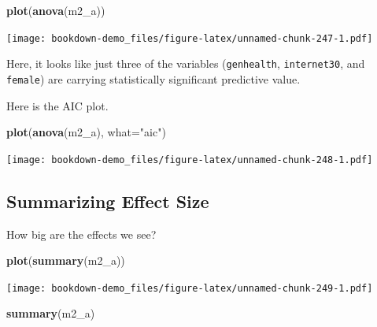\documentclass[]{book}
\newenvironment{Shaded}{\begin{snugshade}}{\end{snugshade}}
\newcommand{\KeywordTok}[1]{\textcolor[rgb]{0.13,0.29,0.53}{\textbf{#1}}}
\newcommand{\DataTypeTok}[1]{\textcolor[rgb]{0.13,0.29,0.53}{#1}}
\newcommand{\StringTok}[1]{\textcolor[rgb]{0.31,0.60,0.02}{#1}}
\newcommand{\NormalTok}[1]{#1}
\theoremstyle{definition}
\theoremstyle{definition}
\theoremstyle{definition}
\theoremstyle{remark}
\begin{document}
\begin{Shaded}
\begin{Highlighting}[]
\KeywordTok{plot}\NormalTok{(}\KeywordTok{anova}\NormalTok{(m2_a))}
\end{Highlighting}
\end{Shaded}

\texttt{[image: bookdown-demo\_files/figure-latex/unnamed-chunk-247-1.pdf]}

Here, it looks like just three of the variables (\texttt{genhealth},
\texttt{internet30}, and \texttt{female}) are carrying statistically
significant predictive value.

Here is the AIC plot.

\begin{Shaded}
\begin{Highlighting}[]
\KeywordTok{plot}\NormalTok{(}\KeywordTok{anova}\NormalTok{(m2_a), }\DataTypeTok{what=}\StringTok{"aic"}\NormalTok{)}
\end{Highlighting}
\end{Shaded}

\texttt{[image: bookdown-demo\_files/figure-latex/unnamed-chunk-248-1.pdf]}

\subsection{Summarizing Effect Size}\label{summarizing-effect-size-1}

How big are the effects we see?

\begin{Shaded}
\begin{Highlighting}[]
\KeywordTok{plot}\NormalTok{(}\KeywordTok{summary}\NormalTok{(m2_a))}
\end{Highlighting}
\end{Shaded}

\texttt{[image: bookdown-demo\_files/figure-latex/unnamed-chunk-249-1.pdf]}

\begin{Shaded}
\begin{Highlighting}[]
\KeywordTok{summary}\NormalTok{(m2_a)}
\end{Highlighting}
\end{Shaded}
\end{document}
